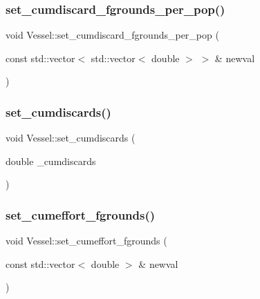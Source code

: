\mbox{\label{class_vessel_ac49a748160127f353d2cd22e5eb75c2e}} 
\subsubsection{\texorpdfstring{set\_cumdiscard\_fgrounds\_per\_pop()}{set\_cumdiscard\_fgrounds\_per\_pop()}}
{\footnotesize\ttfamily void Vessel\+::set\+\_\+cumdiscard\+\_\+fgrounds\+\_\+per\+\_\+pop (\begin{DoxyParamCaption}\item[{const std\+::vector$<$ std\+::vector$<$ double $>$ $>$ \&}]{newval }\end{DoxyParamCaption})}

\mbox{\label{class_vessel_ac9c63874aedbecbc15004e787a8eb9ad}} 
\subsubsection{\texorpdfstring{set\_cumdiscards()}{set\_cumdiscards()}}
{\footnotesize\ttfamily void Vessel\+::set\+\_\+cumdiscards (\begin{DoxyParamCaption}\item[{double}]{\+\_\+cumdiscards }\end{DoxyParamCaption})}

\mbox{\label{class_vessel_af4f1e3170ec6f71aeed23aac07110d65}} 
\subsubsection{\texorpdfstring{set\_cumeffort\_fgrounds()}{set\_cumeffort\_fgrounds()}}
{\footnotesize\ttfamily void Vessel\+::set\+\_\+cumeffort\+\_\+fgrounds (\begin{DoxyParamCaption}\item[{const std\+::vector$<$ double $>$ \&}]{newval }\end{DoxyParamCaption})}

